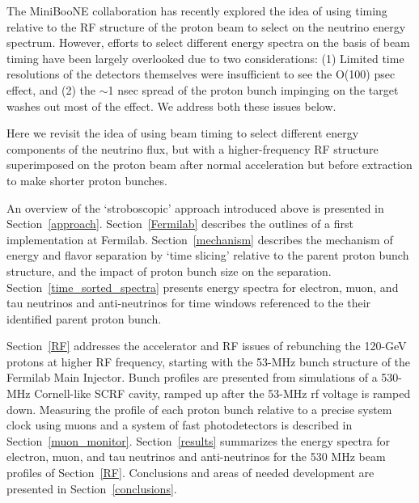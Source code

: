 The MiniBooNE collaboration has recently explored the idea of using
timing relative to the RF structure of the proton beam 
to select on the neutrino energy spectrum. However, efforts to
select different energy spectra on the basis of beam timing have been largely overlooked due to two considerations: (1) Limited time
resolutions of the detectors themselves were insufficient to see the
O(100) psec effect, and (2) the $\sim$1 nsec spread of the proton
bunch impinging on the target washes out most of the effect. We
address both these issues below.

Here we revisit the idea of using beam timing to select different
energy components of the neutrino flux, but with a higher-frequency RF
structure superimposed on the proton beam after normal acceleration
but before extraction to make shorter proton bunches.

An overview of the `stroboscopic' approach introduced above is
presented in Section~\ref{approach}. Section~\ref{Fermilab} describes
the outlines of a first implementation at Fermilab.
Section~\ref{mechanism} describes the mechanism of energy and flavor
separation by `time slicing' relative to the parent proton bunch
structure, and the impact of proton bunch size on the separation.
Section~\ref{time_sorted_spectra} presents energy spectra for
electron, muon, and tau neutrinos and anti-neutrinos for time windows
referenced to the their identified parent proton bunch.

Section~\ref{RF} addresses the accelerator and RF issues of rebunching
the 120-GeV protons at higher RF frequency, starting with the 53-MHz bunch structure of the
Fermilab Main Injector. Bunch profiles are presented from simulations
of a 530-MHz Cornell-like SCRF cavity, ramped up after the 53-MHz rf voltage is ramped
down. Measuring the profile of each proton bunch relative to a precise
system clock using muons and a system of fast photodetectors is
described in Section~\ref{muon_monitor}.  Section~\ref{results}
summarizes the energy spectra for electron, muon, and tau neutrinos
and anti-neutrinos for the 530 MHz beam profiles of
Section~\ref{RF}. Conclusions and areas of needed development are
presented in Section~\ref{conclusions}.

